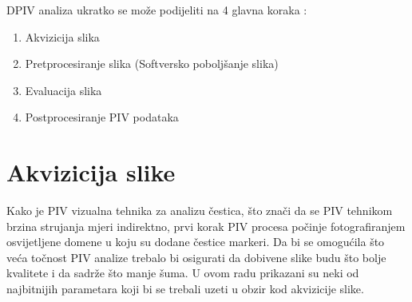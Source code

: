 DPIV analiza ukratko se može podijeliti na 4 glavna koraka \cite{thielicke2014_article}: 
\begin{enumerate}[topsep=0pt, itemsep=0em]
	\item Akvizicija slika
	\item Pretprocesiranje slika (Softversko poboljšanje slika)
	\item Evaluacija slika
	\item Postprocesiranje PIV podataka
\end{enumerate}
\FloatBarrier
\section{Akvizicija slike}
Kako je PIV vizualna tehnika za analizu čestica, što znači da se PIV tehnikom brzina strujanja mjeri indirektno, prvi korak PIV procesa počinje fotografiranjem osvijetljene domene u koju su dodane čestice markeri. Da bi se omogućila što veća točnost PIV analize trebalo bi osigurati da dobivene slike budu što bolje kvalitete i da sadrže što manje šuma. U ovom radu prikazani su neki od najbitnijih parametara koji bi se trebali uzeti u obzir kod akvizicije slike. 

